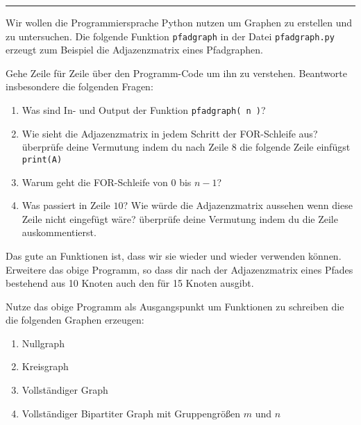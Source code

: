 



  \sheet[%
  number=1,
      topic={Einf\"uhrung in Netzwerktheorie},
    ]

\vspace{-1cm}
\noindent\rule{12cm}{0.4pt}

  \exercise[%
  topic = Graphen mit Python erstellen.
    ]

Wir wollen die Programmiersprache Python nutzen um Graphen zu erstellen
und zu untersuchen. Die folgende Funktion {\tt pfadgraph} in der Datei {\tt pfadgraph.py} erzeugt zum Beispiel die Adjazenzmatrix eines Pfadgraphen.
  




 \subexercise[%
  topic=Programm verstehen und ver\"andern,
    ]

Gehe Zeile f\"ur Zeile \"uber den Programm-Code um ihn zu verstehen. Beantworte insbesondere die folgenden Fragen:

\begin{enumerate}
\item Was sind In- und Output der Funktion {\tt pfadgraph( n )}?
\item Wie sieht die Adjazenzmatrix in jedem Schritt der FOR-Schleife aus? \"uberpr\"ufe deine Vermutung indem du nach Zeile $8$ die folgende Zeile einf\"ugst {\tt print(A)}
\item Warum geht die FOR-Schleife von $0$ bis $n-1$?
\item Was passiert in Zeile $10$? Wie w\"urde die Adjazenzmatrix aussehen wenn diese Zeile nicht eingef\"ugt w\"are? \"uberpr\"ufe deine Vermutung indem du die Zeile auskommentierst.
\end{enumerate}

Das gute an Funktionen ist, dass wir sie wieder und wieder verwenden k\"onnen. Erweitere das obige Programm, so dass dir nach der Adjazenzmatrix eines Pfades bestehend aus 10 Knoten auch den f\"ur 15 Knoten ausgibt.

 \subexercise[%
  topic=Netzwerke erstellen,
    ]

Nutze das obige Programm als Ausgangspunkt um Funktionen zu schreiben die die folgenden Graphen erzeugen:

\begin{enumerate}
\item Nullgraph
\item Kreisgraph
\item Vollst\"andiger Graph
\item Vollst\"andiger Bipartiter Graph mit Gruppengr\"o\ss en $m$ und $n$
\end{enumerate}


